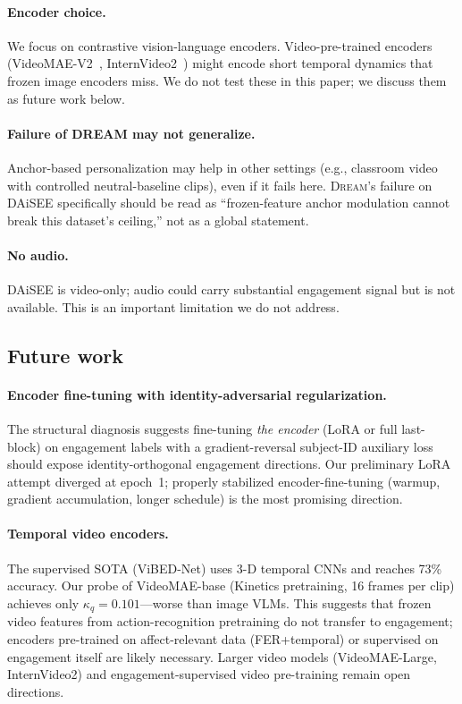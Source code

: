 \paragraph{Encoder choice.} We focus on contrastive
vision-language encoders. Video-pre-trained encoders
(VideoMAE-V2~\cite{wang2023videomae},
InternVideo2~\cite{wang2024internvideo2}) might encode short
temporal dynamics that frozen image encoders miss. We do not test
these in this paper; we discuss them as future work below.

\paragraph{Failure of DREAM may not generalize.} Anchor-based
personalization may help in other settings (e.g., classroom video
with controlled neutral-baseline clips), even if it fails here.
\textsc{Dream}'s failure on DAiSEE specifically should be read as
``frozen-feature anchor modulation cannot break this dataset's
ceiling,'' not as a global statement.

\paragraph{No audio.} DAiSEE is video-only; audio could carry
substantial engagement signal but is not available. This is an
important limitation we do not address.

\subsection{Future work}

\paragraph{Encoder fine-tuning with identity-adversarial
regularization.} The structural diagnosis suggests fine-tuning
\emph{the encoder} (LoRA or full last-block) on engagement labels
with a gradient-reversal subject-ID auxiliary loss should expose
identity-orthogonal engagement directions. Our preliminary LoRA
attempt diverged at epoch~1; properly stabilized
encoder-fine-tuning (warmup, gradient accumulation, longer
schedule) is the most promising direction.

\paragraph{Temporal video encoders.} The supervised SOTA
(ViBED-Net) uses 3-D temporal CNNs and reaches 73\% accuracy.
Our probe of VideoMAE-base (Kinetics pretraining, 16 frames per
clip) achieves only $\kappa_q = 0.101$---worse than image VLMs.
This suggests that frozen video features from action-recognition
pretraining do not transfer to engagement; encoders pre-trained on
affect-relevant data (FER+temporal) or supervised on engagement
itself are likely necessary. Larger video models (VideoMAE-Large,
InternVideo2) and engagement-supervised video pre-training remain
open directions.

